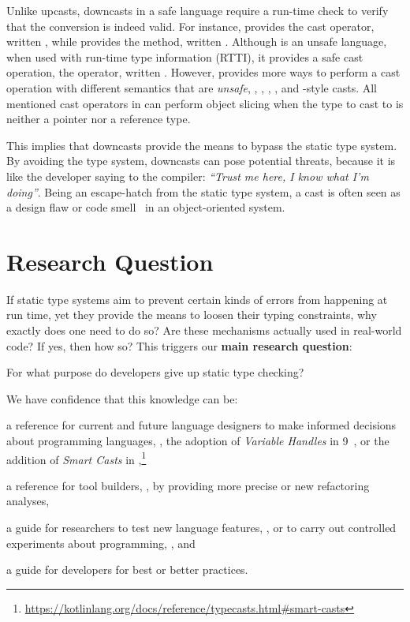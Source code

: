 Unlike upcasts,
downcasts in a safe language require a run-time check to verify that the conversion is indeed valid.
For instance, \java{} provides the cast operator, written ,
while \scala{} provides the  method,
written .
Although \cpp{} is an unsafe language,
when used with run-time type information (RTTI),
it provides a safe cast operation, the  operator,
written .
However,
\cpp{} provides more ways to perform a cast operation with different semantics that are \emph{unsafe}, \ie{},
,
,
, and
\cc{}-style casts.
All mentioned cast operators in \cpp{} can perform object slicing when the type to cast to is neither a pointer nor a reference type.

This implies that downcasts provide the means to bypass the static type system.
By avoiding the type system, downcasts can pose potential threats, because it is like the developer saying to the compiler: \emph{``Trust me here, I know what I'm doing''}.
Being an escape-hatch from the static type system,
a cast is often seen as a design flaw or code smell~\citep{tufanoWhenWhyYour2015} in an object-oriented system.


\section{Research Question}

If static type systems aim to prevent certain kinds of errors from happening at run time,
yet they provide the means to loosen their typing constraints,
why exactly does one need to do so?
Are these mechanisms actually used in real-world code?
If yes, then how so?
This triggers our \textbf{main research question}:

\begin{mdframed}

\centering
For what purpose do developers give up static type checking?
\end{mdframed}

We have confidence that this knowledge can be:
\begin{inparaenum}[a)]
\item a reference for current and future language designers
to make informed decisions about programming languages,
\eg{}, the adoption of \emph{Variable Handles} in \java{} 9~\citep{jep193},
or the addition of \emph{Smart Casts} in ,\footnote{\url{https://kotlinlang.org/docs/reference/typecasts.html\#smart-casts}}
\item a reference for tool builders, \eg{}, by providing more precise or new refactoring analyses,
\item a guide for researchers to test new language features, \eg{}, \cite{wintherGuardedTypePromotion2011} or to carry out controlled experiments about programming, \eg{}, \cite{stuchlikStaticVsDynamic2011} and
\item a guide for developers for best or better practices.
\end{inparaenum}

